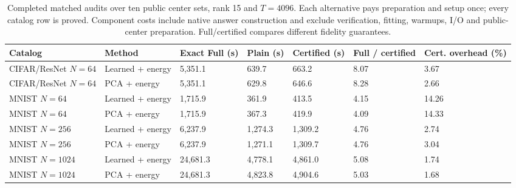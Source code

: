 \begin{table}[tp]
\caption{Completed matched audits over ten public center sets, rank 15 and $T=4096$. Each alternative pays preparation and setup once; every catalog row is proved. Component costs include native answer construction and exclude verification, fitting, warmups, I/O and public-center preparation. Full/certified compares different fidelity guarantees.}\label{tab:matched-public-full}
\centering\small
\begin{adjustbox}{max width=\textwidth}
\begin{tabular}{@{}lllllll@{}}
\toprule
Catalog & Method & Exact Full (s) & Plain (s) & Certified (s) & Full / certified & Cert. overhead (\%) \\
\midrule
CIFAR/ResNet $N=64$ & Learned + energy & 5,351.1 & 639.7 & 663.2 & 8.07 & 3.67 \\
CIFAR/ResNet $N=64$ & PCA + energy & 5,351.1 & 629.8 & 646.6 & 8.28 & 2.66 \\
MNIST $N=64$ & Learned + energy & 1,715.9 & 361.9 & 413.5 & 4.15 & 14.26 \\
MNIST $N=64$ & PCA + energy & 1,715.9 & 367.3 & 419.9 & 4.09 & 14.33 \\
MNIST $N=256$ & Learned + energy & 6,237.9 & 1,274.3 & 1,309.2 & 4.76 & 2.74 \\
MNIST $N=256$ & PCA + energy & 6,237.9 & 1,271.1 & 1,309.7 & 4.76 & 3.04 \\
MNIST $N=1024$ & Learned + energy & 24,681.3 & 4,778.1 & 4,861.0 & 5.08 & 1.74 \\
MNIST $N=1024$ & PCA + energy & 24,681.3 & 4,823.8 & 4,904.6 & 5.03 & 1.68 \\
\bottomrule
\end{tabular}
\end{adjustbox}
\end{table}
